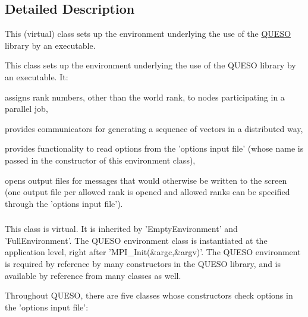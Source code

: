 \subsection{Detailed Description}
This (virtual) class sets up the environment underlying the use of the \hyperlink{namespace_q_u_e_s_o}{Q\-U\-E\-S\-O} library by an executable. 

\begin{DoxyVerb}This class sets up the environment underlying the use of the QUESO library by an executable. It:
\end{DoxyVerb}
 
\begin{DoxyEnumerate}
\item assigns rank numbers, other than the world rank, to nodes participating in a parallel job, 
\item provides communicators for generating a sequence of vectors in a distributed way, 
\item provides functionality to read options from the 'options input file' (whose name is passed in the constructor of this environment class), 
\item opens output files for messages that would otherwise be written to the screen (one output file per allowed rank is opened and allowed ranks can be specified through the 'options input file'). \subsubsection*{}



\begin{DoxyVerb}This class is virtual. It is inherited by 'EmptyEnvironment' and 'FullEnvironment'.
The QUESO environment class is instantiated at the application level, right after 'MPI_Init(&argc,&argv)'.
The QUESO environment is required by reference by many constructors in the QUESO library,
and is available by reference from many classes as well.
\end{DoxyVerb}
 



\begin{DoxyVerb}Throughout QUESO, there are five classes whose constructors check options in the 'options input file':
\end{DoxyVerb}
 

\end{DoxyEnumerate}
